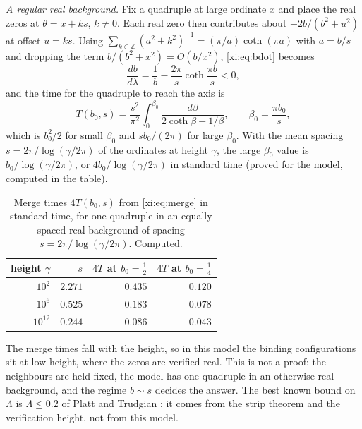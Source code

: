 \emph{A regular real background.} Fix a quadruple at large ordinate $x$ and place the real zeros at $\theta=x+ks$, $k\ne0$. Each real zero then contributes about $-2b/(b^2+u^2)$ at offset $u=ks$. Using $\sum_{k\in\mathbb Z}(a^2+k^2)^{-1}=(\pi/a)\coth(\pi a)$ with $a=b/s$ and dropping the term $b/(b^2+x^2)=O(b/x^2)$, \eqref{xi:eq:bdot} becomes
\begin{equation}\label{xi:eq:coth}
\frac{db}{d\lambda}=\frac1b-\frac{2\pi}s\coth\frac{\pi b}s<0,
\end{equation}
and the time for the quadruple to reach the axis is
\begin{equation}\label{xi:eq:merge}
T(b_0,s)=\frac{s^2}{\pi^2}\int_0^{\beta_0}\frac{d\beta}{2\coth\beta-1/\beta},\qquad\beta_0=\frac{\pi b_0}s,
\end{equation}
which is $b_0^2/2$ for small $\beta_0$ and $sb_0/(2\pi)$ for large $\beta_0$. With the mean spacing $s=2\pi/\log(\gamma/2\pi)$ of the ordinates at height $\gamma$, the large $\beta_0$ value is $b_0/\log(\gamma/2\pi)$, or $4b_0/\log(\gamma/2\pi)$ in standard time (proved for the model, computed in the table).

\begin{table}[htbp]
\centering\small
\begin{tabular}{@{}rrrr@{}}
\toprule
height $\gamma$ & $s$ & $4T$ at $b_0=\frac12$ & $4T$ at $b_0=\frac14$\\
\midrule
$10^2$ & $2.271$ & $0.435$ & $0.120$\\
$10^6$ & $0.525$ & $0.183$ & $0.078$\\
$10^{12}$ & $0.244$ & $0.086$ & $0.043$\\
\bottomrule
\end{tabular}
\caption{Merge times $4T(b_0,s)$ from \eqref{xi:eq:merge} in standard time, for one quadruple in an equally spaced real background of spacing $s=2\pi/\log(\gamma/2\pi)$. Computed.}
\label{xi:tab:merge}
\end{table}

\begin{remark}\label{xi:rem:frozen}
The merge times fall with the height, so in this model the binding configurations sit at low height, where the zeros are verified real. This is not a proof: the neighbours are held fixed, the model has one quadruple in an otherwise real background, and the regime $b\sim s$ decides the answer. The best known bound on $\Lambda$ is $\Lambda\le0.2$ of Platt and Trudgian \cite{PT21}; it comes from the strip theorem and the verification height, not from this model.
\end{remark}

